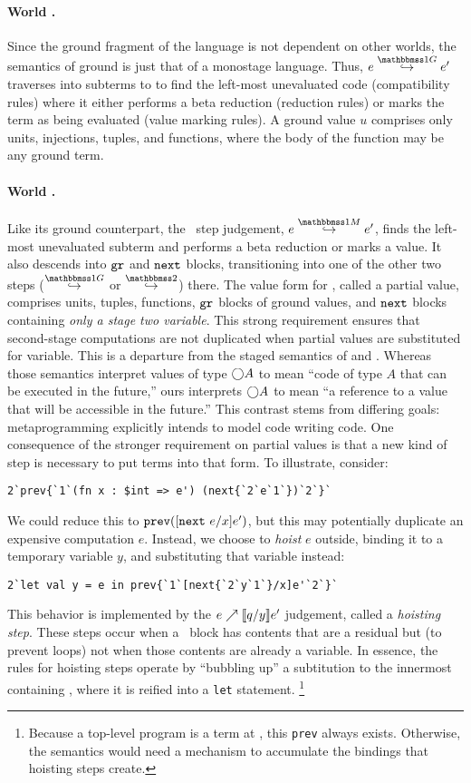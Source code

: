 \paragraph{World \bbonep.} Since the ground fragment of the language is not dependent on other worlds, the semantics of ground is just that of a monostage language.
Thus, $\steppure e {e'}$ traverses into subterms to to find the left-most unevaluated code (compatibility rules) 
where it either performs a beta reduction (reduction rules) or marks the term as being evaluated (value marking rules). 
A ground value $u$ comprises only units, injections, tuples, and functions, where the body of the function may be any ground term.

\paragraph{World \bbonem.}
Like its ground counterpart, the \bbonem\ step judgement, $\stepmix e {e'}$, finds the left-most unevaluated subterm and performs a beta reduction or marks a value.
It also descends into ${\tt gr}$ and ${\tt next}$ blocks, transitioning into one of the other two steps ($\stepsym \bbonep$ or $\stepsym \bbtwo$) there. 
The value form for \bbonem, called a partial value, comprises units, tuples, functions, ${\tt gr}$ blocks of ground values, and ${\tt next}$ blocks containing \emph{only a stage two variable}.
This strong requirement ensures that second-stage computations are not duplicated when partial values are substituted for variable.
This is a departure from the staged semantics of \cite{taha-thesis-99} and \cite{davies96}.
Whereas those semantics interpret values of type $\bigcirc A$ to mean ``code of type $A$ that can be executed in the future,''
ours interprets $\bigcirc A$ to mean ``a reference to a value that will be accessible in the future.''
This contrast stems from differing goals: metaprogramming explicitly intends to model code writing code.
One consequence of the stronger requirement on partial values is that a new kind of step is necessary to put terms into that form.
To illustrate, consider:
\begin{lstlisting}
2`prev{`1`(fn x : $int => e') (next{`2`e`1`})`2`}`
\end{lstlisting}
We could reduce this to ${\tt prev}([{\tt next}~e/x]e')$, but this may potentially duplicate an
expensive computation $e$. Instead, we choose to \emph{hoist} $e$ outside, binding it
to a temporary variable $y$, and substituting that variable instead:
\begin{lstlisting} 
2`let val y = e in prev{`1`[next{`2`y`1`}/x]e'`2`}`
\end{lstlisting}
This behavior is implemented by the ${e}\nearrow \llbracket q/y \rrbracket{e'}$ judgement, called a \emph{hoisting step}.
These steps occur when a \next\ block has contents that are a residual but (to prevent loops) not when those contents are already a variable.
In essence, the rules for hoisting steps operate by ``bubbling up'' a subtitution to the innermost containing \prev,
where it is reified into a {\tt let} statement.
\footnote{Because a top-level program is a term at \bbtwo, this {\tt prev} always exists.
Otherwise, the semantics would need a mechanism to accumulate the bindings that hoisting steps create.}

